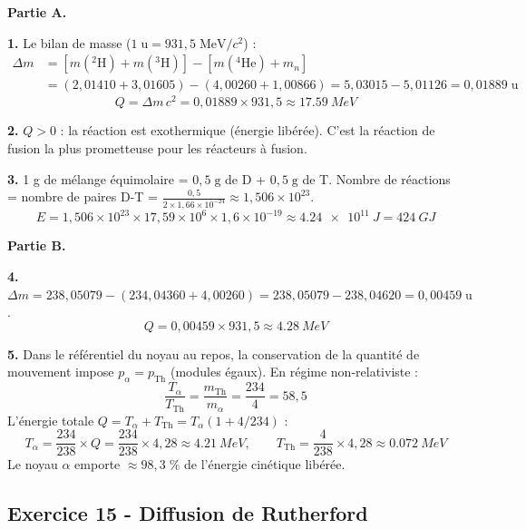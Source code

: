 \documentclass[12pt,a4paper]{article}
\begin{document}
\begin{boitecorrige}
\textbf{Partie A.}

\textbf{1.} Le bilan de masse ($1\;\text{u} = 931{,}5\;\text{MeV}/c^2$) :
\begin{align*}
\Delta m &= [m({}^2\text{H})+m({}^3\text{H})] - [m({}^4\text{He})+m_n]\\
&= (2{,}01410+3{,}01605) - (4{,}00260+1{,}00866) = 5{,}03015 - 5{,}01126 = 0{,}01889\;\text{u}
\end{align*}
\[
Q = \Delta m\,c^2 = 0{,}01889\times931{,}5 \approx \qty{17.59}{MeV}
\]

\textbf{2.} $Q>0$ : la réaction est exothermique (énergie libérée). C'est la réaction de fusion la plus prometteuse pour les réacteurs à fusion.

\textbf{3.} 1 g de mélange équimolaire = $0{,}5\;\text{g}$ de D + $0{,}5\;\text{g}$ de T.
Nombre de réactions = nombre de paires D-T = $\frac{0{,}5}{2\times1{,}66\times10^{-24}} \approx 1{,}506\times10^{23}$.
\[
E = 1{,}506\times10^{23}\times17{,}59\times10^6\times1{,}6\times10^{-19} \approx \qty{4.24e11}{J} = \qty{424}{GJ}
\]

\textbf{Partie B.}

\textbf{4.} $\Delta m = 238{,}05079 - (234{,}04360+4{,}00260) = 238{,}05079 - 238{,}04620 = 0{,}00459\;\text{u}$.
\[
Q = 0{,}00459\times931{,}5 \approx \qty{4.28}{MeV}
\]

\textbf{5.} Dans le référentiel du noyau au repos, la conservation de la quantité de mouvement impose $p_\alpha = p_\text{Th}$ (modules égaux). En régime non-relativiste :
\[
\frac{T_\alpha}{T_\text{Th}} = \frac{m_\text{Th}}{m_\alpha} = \frac{234}{4} = 58{,}5
\]
L'énergie totale $Q = T_\alpha + T_\text{Th} = T_\alpha(1 + 4/234)$ :
\[
T_\alpha = \frac{234}{238}\times Q = \frac{234}{238}\times4{,}28 \approx \qty{4.21}{MeV}, \qquad T_\text{Th} = \frac{4}{238}\times4{,}28 \approx \qty{0.072}{MeV}
\]
Le noyau $\alpha$ emporte $\approx98{,}3\;\%$ de l'énergie cinétique libérée.
\end{boitecorrige}

\subsection*{Exercice 15 - Diffusion de Rutherford \niveau{\difficile}}
\end{document}
